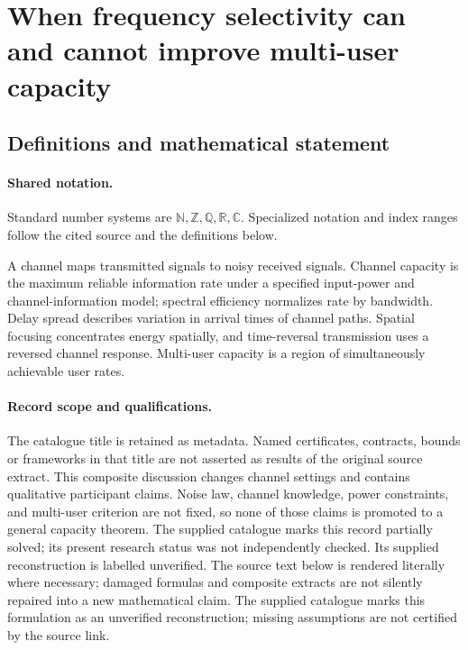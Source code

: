 \documentclass[11pt]{article}
\begin{document}
\section{When frequency selectivity can and cannot improve multi-user capacity}\label{statement}

\subsection{Definitions and mathematical statement}

\paragraph{Shared notation.}Standard number systems are $\mathbb N,\mathbb Z,\mathbb Q,\mathbb R,\mathbb C$. Specialized notation and index ranges follow the cited source and the definitions below.


A channel maps transmitted signals to noisy received signals. Channel capacity is the maximum reliable information rate under a specified input-power and channel-information model; spectral efficiency normalizes rate by bandwidth. Delay spread describes variation in arrival times of channel paths. Spatial focusing concentrates energy spatially, and time-reversal transmission uses a reversed channel response. Multi-user capacity is a region of simultaneously achievable user rates.
\paragraph{Record scope and qualifications.}
The catalogue title is retained as metadata. Named certificates, contracts, bounds or frameworks in that title are not asserted as results of the original source extract.
This composite discussion changes channel settings and contains qualitative participant claims. Noise law, channel knowledge, power constraints, and multi-user criterion are not fixed, so none of those claims is promoted to a general capacity theorem. The supplied catalogue marks this record partially solved; its present research status was not independently checked. Its supplied reconstruction is labelled unverified.
The source text below is rendered literally where necessary; damaged formulas and composite extracts are not silently repaired into a new mathematical claim.
The supplied catalogue marks this formulation as an unverified reconstruction; missing assumptions are not certified by the source link.
\end{document}
